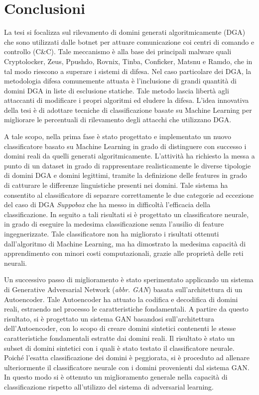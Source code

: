 \chapter{Conclusioni}
\label{conclusioni}
La tesi si focalizza sul rilevamento di domini generati algoritmicamente (DGA) che sono utilizzati dalle botnet per attuare comunicazione coi centri di comando e controllo (C\&C). Tale meccanismo è alla base dei principali malware quali Cryptolocker, Zeus, Ppushdo, Rovnix, Tinba, Conficker, Matsnu e Ramdo, che in tal modo riescono a superare i sistemi di difesa. Nel caso particolare dei DGA, la metodologia difesa comunemente attuata è l'inclusione di grandi quantità di domini DGA in liste di esclusione statiche. Tale metodo lascia libertà agli attaccanti di modificare i propri algoritmi ed eludere la difesa. L'idea innovativa della tesi è di adottare tecniche di classificazione basate su Machine Learning per migliorare le percentuali di rilevamento degli attacchi che utilizzano DGA.

A tale scopo, nella prima fase è stato progettato e implementato un nuovo classificatore basato su Machine Learning in grado di distinguere con successo i domini reali da quelli generati algoritmicamente. L'attività ha richiesto la messa a punto di un dataset in grado di rappresentare realisticamente le diverse tipologie di domini DGA e domini legittimi, tramite la definizione delle features in grado di catturare le differenze linguistiche presenti nei domini. Tale sistema ha consentito al classificatore di separare correttamente le due categorie ad eccezione del caso di DGA \textit{Suppobox} che ha messo in difficoltà l'efficacia della classificazione. In seguito a tali risultati si è progettato un classificatore neurale, in grado di eseguire la medesima classificazione senza l'ausilio di feature ingegnerizzate. Tale classificatore non ha migliorato i risultati ottenuti dall'algoritmo di Machine Learning, ma ha dimostrato la medesima capacità di apprendimento con minori costi computazionali, grazie alle proprietà delle reti neurali.

Un successivo passo di miglioramento è stato sperimentato applicando un sistema di Generative Adversarial Network (\textit{abbr. GAN}) basata sull'architettura di un Autoencoder. Tale Autoencoder ha attuato la codifica e decodifica di domini reali, estraendo nel processo le caratteristiche fondamentali. A partire da questo risultato, si è progettato un sistema GAN basandosi sull'architettura dell'Autoencoder, con lo scopo di creare domini sintetici contenenti le stesse caratteristiche fondamentali estratte dai domini reali. Il risultato è stato un subset di domini sintetici con i quali è stato testato il classificatore neurale. Poiché l'esatta classificazione dei domini è peggiorata, si è proceduto ad allenare ulteriormente il classificatore neurale con i domini provenienti dal sistema GAN. In questo modo si è ottenuto un miglioramento generale nella capacità di classificazione rispetto all'utilizzo del sistema di adversarial learning.

